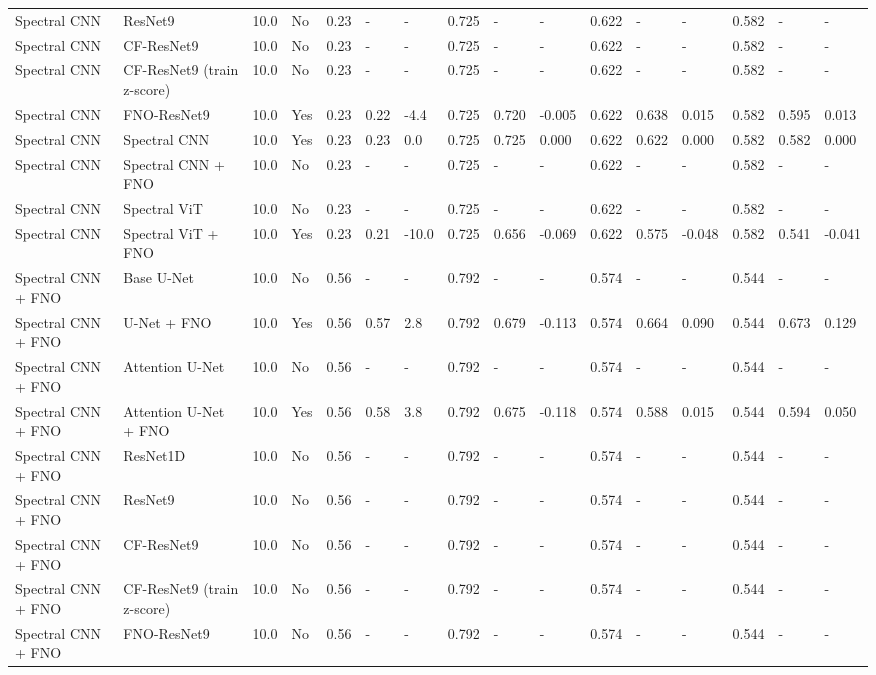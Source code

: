 \begin{longtable}{llllllllllllllll}
Spectral CNN & ResNet9 & 10.0 & No & 0.23 & - & - & 0.725 & - & - & 0.622 & - & - & 0.582 & - & - \\
Spectral CNN & CF-ResNet9 & 10.0 & No & 0.23 & - & - & 0.725 & - & - & 0.622 & - & - & 0.582 & - & - \\
Spectral CNN & CF-ResNet9 (train z-score) & 10.0 & No & 0.23 & - & - & 0.725 & - & - & 0.622 & - & - & 0.582 & - & - \\
Spectral CNN & FNO-ResNet9 & 10.0 & Yes & 0.23 & 0.22 & -4.4 & 0.725 & 0.720 & -0.005 & 0.622 & 0.638 & 0.015 & 0.582 & 0.595 & 0.013 \\
Spectral CNN & Spectral CNN & 10.0 & Yes & 0.23 & 0.23 & 0.0 & 0.725 & 0.725 & 0.000 & 0.622 & 0.622 & 0.000 & 0.582 & 0.582 & 0.000 \\
Spectral CNN & Spectral CNN + FNO & 10.0 & No & 0.23 & - & - & 0.725 & - & - & 0.622 & - & - & 0.582 & - & - \\
Spectral CNN & Spectral ViT & 10.0 & No & 0.23 & - & - & 0.725 & - & - & 0.622 & - & - & 0.582 & - & - \\
Spectral CNN & Spectral ViT + FNO & 10.0 & Yes & 0.23 & 0.21 & -10.0 & 0.725 & 0.656 & -0.069 & 0.622 & 0.575 & -0.048 & 0.582 & 0.541 & -0.041 \\
Spectral CNN + FNO & Base U-Net & 10.0 & No & 0.56 & - & - & 0.792 & - & - & 0.574 & - & - & 0.544 & - & - \\
Spectral CNN + FNO & U-Net + FNO & 10.0 & Yes & 0.56 & 0.57 & 2.8 & 0.792 & 0.679 & -0.113 & 0.574 & 0.664 & 0.090 & 0.544 & 0.673 & 0.129 \\
Spectral CNN + FNO & Attention U-Net & 10.0 & No & 0.56 & - & - & 0.792 & - & - & 0.574 & - & - & 0.544 & - & - \\
Spectral CNN + FNO & Attention U-Net + FNO & 10.0 & Yes & 0.56 & 0.58 & 3.8 & 0.792 & 0.675 & -0.118 & 0.574 & 0.588 & 0.015 & 0.544 & 0.594 & 0.050 \\
Spectral CNN + FNO & ResNet1D & 10.0 & No & 0.56 & - & - & 0.792 & - & - & 0.574 & - & - & 0.544 & - & - \\
Spectral CNN + FNO & ResNet9 & 10.0 & No & 0.56 & - & - & 0.792 & - & - & 0.574 & - & - & 0.544 & - & - \\
Spectral CNN + FNO & CF-ResNet9 & 10.0 & No & 0.56 & - & - & 0.792 & - & - & 0.574 & - & - & 0.544 & - & - \\
Spectral CNN + FNO & CF-ResNet9 (train z-score) & 10.0 & No & 0.56 & - & - & 0.792 & - & - & 0.574 & - & - & 0.544 & - & - \\
Spectral CNN + FNO & FNO-ResNet9 & 10.0 & No & 0.56 & - & - & 0.792 & - & - & 0.574 & - & - & 0.544 & - & - \\

\end{longtable}
